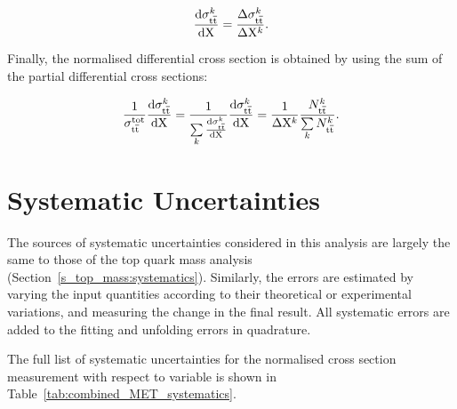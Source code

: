 \begin{equation}
\label{eq:differential_xsection}
\frac{\mathrm{d}\sigma_{\mathrm{t}\overline{\mathrm{t}}}^k}{\mathrm{d} \mathrm{X}} = \frac{\Delta\sigma_{\mathrm{t}\overline{\mathrm{t}}}^k}{\Delta \mathrm{X}^k }.
\end{equation}

Finally, the normalised differential cross section is obtained by using the sum of the partial differential cross
sections:

\begin{equation}
\label{eq:normalised_differential_xsection}
\frac{1}{\sigma_{\mathrm{t}\overline{\mathrm{t}}}^\mathrm{tot}} \frac{\mathrm{d}\sigma_{\mathrm{t}\overline{\mathrm{t}}}^k}{\mathrm{d} \mathrm{X}} =
\frac{1}{\sum\limits_k{\frac{\mathrm{d}\sigma_{\mathrm{t}\overline{\mathrm{t}}}^k}{\mathrm{d} \mathrm{X}}}} \frac{\mathrm{d}\sigma_{\mathrm{t}\overline{\mathrm{t}}}^k}{\mathrm{d}
\mathrm{X}} = \frac{1}{\Delta \mathrm{X}^k} \frac{N_{\mathrm{t}\overline{\mathrm{t}}}^k}{\sum\limits_k N_{\mathrm{t}\overline{\mathrm{t}}}^k}.
\end{equation}

\newpage
\section{Systematic Uncertainties}
\label{s_xsection:systematics}
The sources of systematic uncertainties considered in this analysis are largely the same to those of the top quark mass
analysis (Section~\ref{s_top_mass:systematics}). Similarly, the errors are estimated by varying the input quantities
according to their theoretical or experimental variations, and measuring the change in the final result. All systematic
errors are added to the fitting and unfolding errors in quadrature.

The full list of systematic uncertainties for the normalised cross section measurement with respect to \MET variable is
shown in Table~\ref{tab:combined_MET_systematics}.



